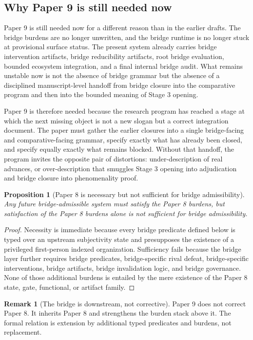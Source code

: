 \documentclass[11pt,a4paper]{article}
\newtheorem{proposition}[theorem]{Proposition}
\theoremstyle{definition}
\newtheorem{remark}[theorem]{Remark}
\begin{document}
\subsection{Why Paper 9 is still needed now}
Paper 9 is still needed now for a different reason than in the earlier drafts. The bridge burdens are no longer unwritten, and the bridge runtime is no longer stuck at provisional surface status. The present system already carries bridge intervention artifacts, bridge reducibility artifacts, root bridge evaluation, bounded ecosystem integration, and a final internal bridge audit. What remains unstable now is not the absence of bridge grammar but the absence of a disciplined manuscript-level handoff from bridge closure into the comparative program and then into the bounded meaning of Stage 3 opening.

Paper 9 is therefore needed because the research program has reached a stage at which the next missing object is not a new slogan but a correct integration document. The paper must gather the earlier closures into a single bridge-facing and comparative-facing grammar, specify exactly what has already been closed, and specify equally exactly what remains blocked. Without that handoff, the program invites the opposite pair of distortions: under-description of real advances, or over-description that smuggles Stage 3 opening into adjudication and bridge closure into phenomenality proof.

\begin{proposition}[Paper 8 is necessary but not sufficient for bridge admissibility]
Any future bridge-admissible system must satisfy the Paper 8 burdens, but satisfaction of the Paper 8 burdens alone is not sufficient for bridge admissibility.
\end{proposition}

\begin{proof}
Necessity is immediate because every bridge predicate defined below is typed over an upstream subjectivity state and presupposes the existence of a privileged first-person indexed organization. Sufficiency fails because the bridge layer further requires bridge predicates, bridge-specific rival defeat, bridge-specific interventions, bridge artifacts, bridge invalidation logic, and bridge governance. None of those additional burdens is entailed by the mere existence of the Paper 8 state, gate, functional, or artifact family.
\end{proof}

\begin{remark}[The bridge is downstream, not corrective]
Paper 9 does not correct Paper 8. It inherits Paper 8 and strengthens the burden stack above it. The formal relation is extension by additional typed predicates and burdens, not replacement.
\end{remark}
\end{document}
